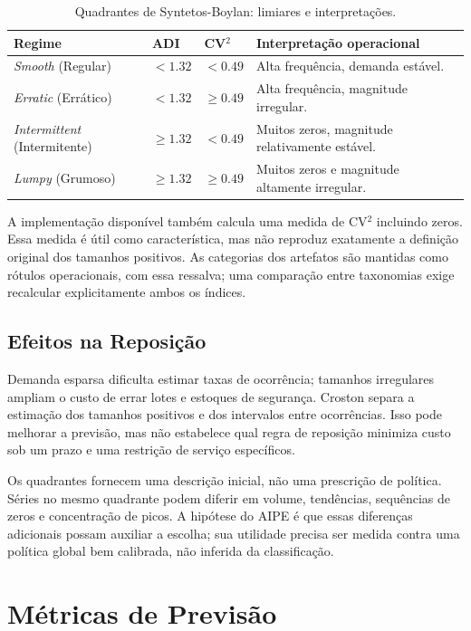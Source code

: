 \begin{table}[htbp]
\centering
\small
\renewcommand{\arraystretch}{1.2}
\caption{Quadrantes de Syntetos-Boylan: limiares e interpretações.}
\label{tab:sb_quad}
\begin{tabular}{llll}
\toprule
Regime & ADI & CV$^2$ & Interpretação operacional \\
\midrule
\textit{Smooth} (Regular) & $< 1.32$ & $< 0.49$ & Alta frequência, demanda estável. \\
\textit{Erratic} (Errático) & $< 1.32$ & $\geq 0.49$ & Alta frequência, magnitude irregular. \\
\textit{Intermittent} (Intermitente) & $\geq 1.32$ & $< 0.49$ & Muitos zeros, magnitude relativamente estável. \\
\textit{Lumpy} (Grumoso) & $\geq 1.32$ & $\geq 0.49$ & Muitos zeros e magnitude altamente irregular. \\
\bottomrule
\end{tabular}
\end{table}

A implementação disponível também calcula uma medida de CV$^2$ incluindo zeros. Essa medida é útil como característica, mas não reproduz exatamente a definição original dos tamanhos positivos. As categorias dos artefatos são mantidas como rótulos operacionais, com essa ressalva; uma comparação entre taxonomias exige recalcular explicitamente ambos os índices.

\subsection{Efeitos na Reposição}

Demanda esparsa dificulta estimar taxas de ocorrência; tamanhos irregulares ampliam o custo de errar lotes e estoques de segurança. Croston separa a estimação dos tamanhos positivos e dos intervalos entre ocorrências. Isso pode melhorar a previsão, mas não estabelece qual regra de reposição minimiza custo sob um prazo e uma restrição de serviço específicos.



Os quadrantes fornecem uma descrição inicial, não uma prescrição de política. Séries no mesmo quadrante podem diferir em volume, tendências, sequências de zeros e concentração de picos. A hipótese do AIPE é que essas diferenças adicionais possam auxiliar a escolha; sua utilidade precisa ser medida contra uma política global bem calibrada, não inferida da classificação.

\section{Métricas de Previsão}

